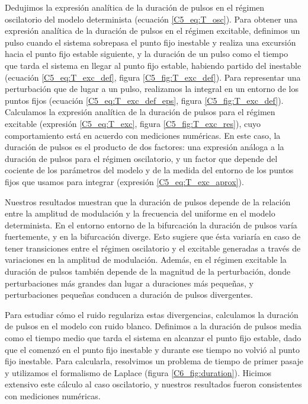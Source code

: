 \documentclass[./main.tex]{subfiles}
\begin{document}
Dedujimos la expresión analítica de la duración de pulsos en el régimen oscilatorio del modelo determinista \cite{Strogatz1994} (ecuación \ref{C5_eq:T_osc}). Para obtener una expresión analítica de la duración de pulsos en el régimen excitable, definimos un pulso cuando el sistema sobrepasa el punto fijo inestable y realiza una excursión hacia el punto fijo estable siguiente, y la duración de un pulso como el tiempo que tarda el sistema en llegar al punto fijo estable, habiendo partido del inestable (ecuación \ref{C5_eq:T_exc_def}, figura \ref{C5_fig:T_exc_def}). Para representar una perturbación que de lugar a un pulso, realizamos la integral en un entorno de los puntos fijos (ecuación \ref{C5_eq:T_exc_def_eps}, figura \ref{C5_fig:T_exc_def}). Calculamos la expresión analítica de la duración de pulsos para el régimen excitable (expresión \ref{C5_eq:T_exc}, figura \ref{C5_fig:T_exc_res}), cuyo comportamiento está en acuerdo con mediciones numéricas. En este caso, la duración de pulsos es el producto de dos factores: una expresión análoga a la duración de pulsos para el régimen oscilatorio, y un factor que depende del cociente de los parámetros del modelo y de la medida del entorno de los puntos fijos que usamos para integrar (expresión \ref{C5_eq:T_exc_aprox}).


Nuestros resultados muestran que la duración de pulsos depende de la relación entre la amplitud de modulación y la frecuencia del uniforme en el modelo determinista. En el entorno entorno de la bifurcación la duración de pulsos varía fuertemente, y en la bifurcación diverge. Esto sugiere que ésta variaría en caso de tener transiciones entre el régimen oscilatorio y el excitable generadas a través de variaciones en la amplitud de modulación. Además, en el régimen excitable la duración de pulsos también depende de la magnitud de la perturbación, donde perturbaciones más grandes dan lugar a duraciones más pequeñas, y 
perturbaciones pequeñas conducen a duración de pulsos divergentes. 

Para estudiar cómo el ruido regulariza estas divergencias, calculamos la duración de pulsos en el modelo con ruido blanco. Definimos a la duración de pulsos media como el tiempo medio que tarda el sistema en alcanzar el punto fijo estable, dado que el comenzó en el punto fijo inestable y durante ese tiempo no volvió al punto fijo inestable. Para calcularla, resolvimos un problema de tiempo de primer pasaje y utilizamos el formalismo de Laplace (figura \ref{C6_fig:duration}). Hicimos extensivo este cálculo al caso oscilatorio, y nuestros resultados fueron consistentes con mediciones numéricas. 
\end{document}

